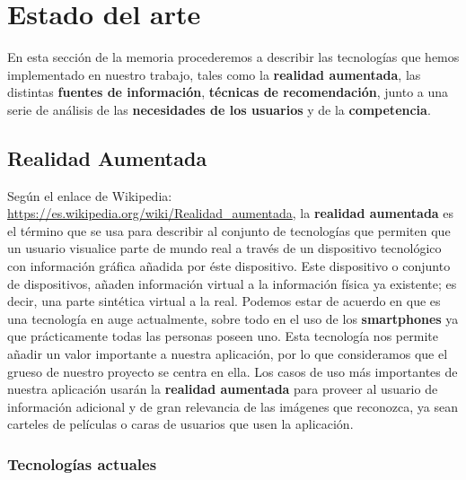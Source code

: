 
\cleardoublepage


\chapter{Estado del arte}
\label{makereference2}
En esta sección de la memoria procederemos a describir las tecnologías que hemos implementado
en nuestro trabajo, tales como la \textbf{realidad aumentada}, las distintas \textbf{fuentes de información}, 
\textbf{técnicas de recomendación}, junto a una serie de análisis de las \textbf{necesidades de los usuarios} y de la \textbf{competencia}.
\section{Realidad Aumentada}
\label{makereference2.1}
Según el enlace de Wikipedia: \url{https://es.wikipedia.org/wiki/Realidad_aumentada}, la \textbf{realidad aumentada} es el término que se 
usa para describir al conjunto de tecnologías que permiten que un usuario visualice parte de mundo real a través de un dispositivo tecnológico 
con información gráfica añadida por éste dispositivo. Este dispositivo o conjunto de dispositivos, añaden información virtual a la información 
física ya existente; es decir, una parte sintética virtual a la real. Podemos estar de acuerdo en que es una tecnología en auge actualmente, sobre todo 
en el uso de los \textbf{smartphones} ya que prácticamente todas las personas poseen uno. Esta tecnología nos permite añadir un valor importante a 
nuestra aplicación, por lo que consideramos que el grueso de nuestro proyecto se centra en ella. Los casos de uso más importantes de nuestra aplicación 
usarán la \textbf{realidad aumentada} para proveer al usuario de información adicional y de gran relevancia de las imágenes que reconozca, ya sean carteles
de películas o caras de usuarios que usen la aplicación.
\subsection{Tecnologías actuales}
\label{makereference2.1.1}

